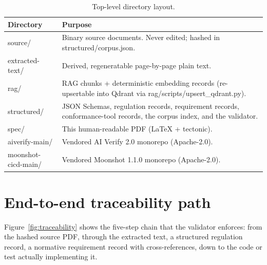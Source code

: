 \documentclass[11pt,a4paper,twoside]{report}
\newcommand{\corpus}{}
\begin{document}
\begin{table}[h]
\centering
\small
\begin{tabularx}{\textwidth}{lX}
\toprule
\textbf{Directory} & \textbf{Purpose} \\
\midrule
\corpus{source/}          & Binary source documents. Never edited; hashed in \corpus{structured/corpus.json}. \\
\corpus{extracted-text/}  & Derived, regeneratable page-by-page plain text. \\
\corpus{rag/}             & RAG chunks + deterministic embedding records (re-upsertable into Qdrant via \corpus{rag/scripts/upsert\_qdrant.py}). \\
\corpus{structured/}      & JSON Schemas, regulation records, requirement records, conformance-tool records, the corpus index, and the validator. \\
\corpus{spec/}            & This human-readable PDF (LaTeX + tectonic). \\
\corpus{aiverify-main/}   & Vendored AI Verify 2.0 monorepo (Apache-2.0). \\
\corpus{moonshot-cicd-main/} & Vendored Moonshot 1.1.0 monorepo (Apache-2.0). \\
\bottomrule
\end{tabularx}
\caption{Top-level directory layout.}
\label{tab:layout}
\end{table}

\section{End-to-end traceability path}

Figure~\ref{fig:traceability} shows the five-step chain that the validator
enforces: from the hashed source PDF, through the extracted text, a
structured regulation record, a normative requirement record with
cross-references, down to the code or test actually implementing it.
\end{document}
